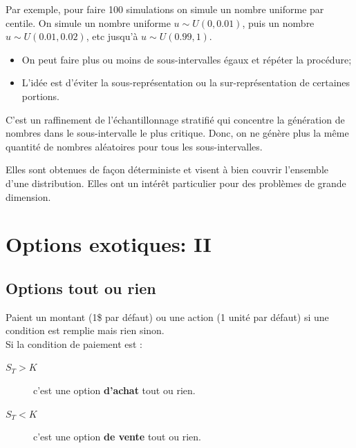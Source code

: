 \documentclass[10pt, french]{article}
\begin{document}
\begin{multicols*}{2}
\begin{definitionNOHFILLsub}
Par exemple, pour faire 100 simulations on simule un nombre uniforme par centile. On simule un nombre uniforme $u \sim U(0, 0.01)$, puis un nombre $u \sim U(0.01, 0.02)$, etc jusqu'à $u \sim U(0.99, 1)$.\\

\begin{itemize}
	\item	On peut faire plus ou moins de sous-intervalles égaux et répéter la procédure;
	\item	L'idée est d'éviter la sous-représentation ou la sur-représentation de certaines portions.
\end{itemize}

\begin{definitionNOHFILLsub}
C'est un raffinement de l'échantillonnage stratifié qui concentre la génération de nombres dans le sous-intervalle le plus critique. Donc, on ne génère plus la même quantité de nombres aléatoires pour tous les sous-intervalles.
\end{definitionNOHFILLsub}
\end{definitionNOHFILLsub}

\begin{definitionNOHFILLsub}
Elles sont obtenues de façon déterministe et visent à bien couvrir l'ensemble d'une distribution. Elles ont un intérêt particulier pour des problèmes de grande dimension.
\end{definitionNOHFILLsub}


\pagebreak
\setcounter{section}{22}
\section{Options exotiques: II}
\subsection{Options tout ou rien}

\begin{definitionNOHFILL}
Paient un montant (1\$ par défaut) ou une action (1 unité par défaut) si une condition est remplie mais rien sinon.\\

Si la condition de paiement est :
\begin{description}
	\item[$S_{T}	>	K$] c'est une option \textbf{d'achat} tout ou rien.
	\item[$S_{T}	<	K$]	c'est une option \textbf{de vente} tout ou rien.
\end{description}


\end{definitionNOHFILL}
\end{multicols*}
\end{document}
